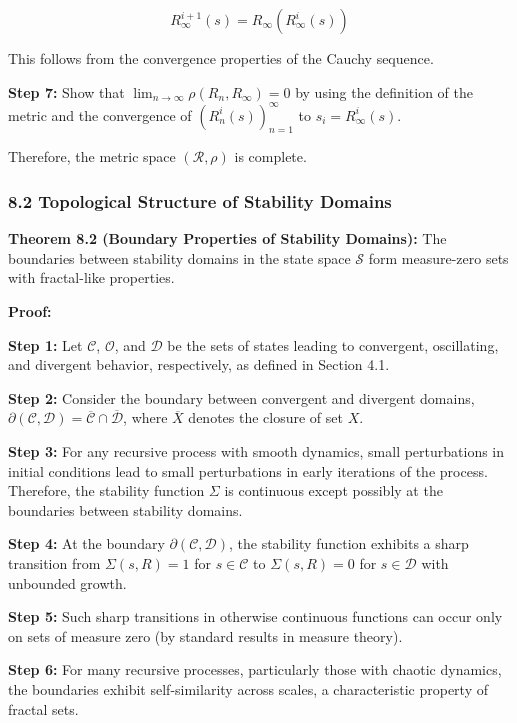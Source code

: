 \documentclass[
]{article}
\begin{document}
\[R_{\infty}^{i+1}(s) = R_{\infty}(R_{\infty}^i(s))\]

This follows from the convergence properties of the Cauchy sequence.

\textbf{Step 7:} Show that
\(\lim_{n \to \infty} \rho(R_n, R_{\infty}) = 0\) by using the
definition of the metric and the convergence of
\((R_n^i(s))_{n=1}^{\infty}\) to \(s_i = R_{\infty}^i(s)\).

Therefore, the metric space \((\mathcal{R}, \rho)\) is complete.

\subsubsection{8.2 Topological Structure of Stability
Domains}\label{topological-structure-of-stability-domains}

\textbf{Theorem 8.2 (Boundary Properties of Stability Domains):} The
boundaries between stability domains in the state space \(\mathcal{S}\)
form measure-zero sets with fractal-like properties.

\textbf{Proof:}

\textbf{Step 1:} Let \(\mathcal{C}\), \(\mathcal{O}\), and
\(\mathcal{D}\) be the sets of states leading to convergent,
oscillating, and divergent behavior, respectively, as defined in Section
4.1.

\textbf{Step 2:} Consider the boundary between convergent and divergent
domains,
\(\partial(\mathcal{C}, \mathcal{D}) = \overline{\mathcal{C}} \cap \overline{\mathcal{D}}\),
where \(\overline{X}\) denotes the closure of set \(X\).

\textbf{Step 3:} For any recursive process with smooth dynamics, small
perturbations in initial conditions lead to small perturbations in early
iterations of the process. Therefore, the stability function \(\Sigma\)
is continuous except possibly at the boundaries between stability
domains.

\textbf{Step 4:} At the boundary \(\partial(\mathcal{C}, \mathcal{D})\),
the stability function exhibits a sharp transition from
\(\Sigma(s, R) = 1\) for \(s \in \mathcal{C}\) to \(\Sigma(s, R) = 0\)
for \(s \in \mathcal{D}\) with unbounded growth.

\textbf{Step 5:} Such sharp transitions in otherwise continuous
functions can occur only on sets of measure zero (by standard results in
measure theory).

\textbf{Step 6:} For many recursive processes, particularly those with
chaotic dynamics, the boundaries exhibit self-similarity across scales,
a characteristic property of fractal sets.
\end{document}
